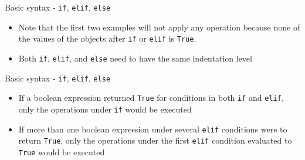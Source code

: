\documentclass[aspectratio=169]{beamer}
\begin{document}
\begin{frame}{Basic syntax - \texttt{if}, \texttt{elif}, \texttt{else}}
\begin{multicols}{3}
	\end{multicols}

	\begin{itemize}
		\item Note that the first two examples will not apply any operation because none of the values of the objects after \texttt{if} or \texttt{elif} is \texttt{True}.
		\item Both \texttt{if}, \texttt{elif}, and \texttt{else} need to have the same indentation level
	\end{itemize}

\end{frame}

\begin{frame}{Basic syntax - \texttt{if}, \texttt{elif}, \texttt{else}}

	\begin{itemize}
		\item If a boolean expression returned \texttt{True} for conditions in both \texttt{if} and \texttt{elif}, only the operations  under \texttt{if} would be executed
		\item If more than one boolean expression under several \texttt{elif} conditions were to return \texttt{True}, only the operations under the first \texttt{elif} condition evaluated to \texttt{True} would be executed
	\end{itemize}

	\begin{multicols}{2}


\end{multicols}
\end{frame}
\end{document}
